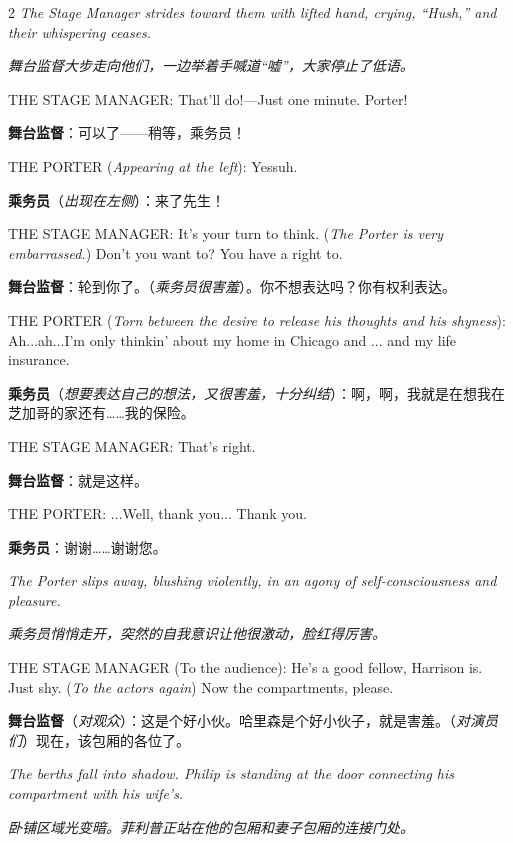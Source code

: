 \documentclass[lang=cn,newtx,10pt,scheme=chinese]{elegantbook}
\newcommand{\pair}[2]{%
\switchcolumn* #2\par
\switchcolumn  #1\par
}
\begin{document}
\begin{paracol}{2}
\pair{
    \textit{舞台监督大步走向他们，一边举着手喊道“嘘”，大家停止了低语。}
}{
    \textit{The Stage Manager strides toward them with lifted hand, crying, “Hush,” and their whispering ceases.}
    \newline
    \newline
}

\pair{
    \textbf{舞台监督}：可以了——稍等，乘务员！
}{
    THE STAGE MANAGER: That'll do!—Just one minute. Porter!
}

\pair{
    \textbf{乘务员}（\textit{出现在左侧}）：来了先生！
}{
    THE PORTER (\textit{Appearing at the left}): Yessuh.
}

\pair{
    \textbf{舞台监督}：轮到你了。（\textit{乘务员很害羞}）。你不想表达吗？你有权利表达。
}{
    THE STAGE MANAGER: It's your turn to think. (\textit{The Porter is very embarrassed.}) Don't you want to? You have a right to.
}

\pair{
    \textbf{乘务员}（\textit{想要表达自己的想法，又很害羞，十分纠结}）：啊，啊，我就是在想我在芝加哥的家还有……我的保险。
}{
    THE PORTER (\textit{Torn between the desire to release his thoughts and his shyness}): Ah...ah...I'm only thinkin' about my home in Chicago and ... and my life insurance.
}

\pair{
    \textbf{舞台监督}：就是这样。
}{
    THE STAGE MANAGER: That's right.
}

\pair{
    \textbf{乘务员}：谢谢……谢谢您。
}{
    THE PORTER: ...Well, thank you... Thank you.
    \newline
    \newline
}

\pair{
    \textit{乘务员悄悄走开，突然的自我意识让他很激动，脸红得厉害。}
}{
    \textit{The Porter slips away, blushing violently, in an agony of self-consciousness and pleasure.}
    \newline
    \newline
}

\pair{
    \textbf{舞台监督}（\textit{对观众}）：这是个好小伙。哈里森是个好小伙子，就是害羞。（\textit{对演员们}）现在，该包厢的各位了。
}{
    THE STAGE MANAGER (To the audience): He's a good fellow, Harrison is. Just shy. (\textit{To the actors again}) Now the compartments, please.
    \newline
    \newline
}

\pair{
    \textit{卧铺区域光变暗。菲利普正站在他的包厢和妻子包厢的连接门处。}
}{
    \textit{The berths fall into shadow. Philip is standing at the door connecting his compartment with his wife's.}
    \newline
    \newline
}


\end{paracol}
\end{document}
